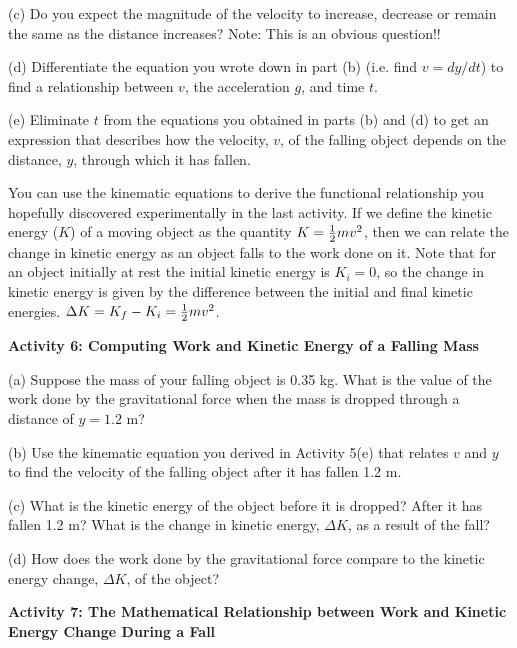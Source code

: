(c) Do you expect the magnitude of the velocity to increase, decrease or remain
the same as the distance increases? Note: This is an obvious question!!
\vspace{10mm}

(d) Differentiate the equation you wrote down in part (b) (i.e. find $v = dy/dt$) to find a relationship between $v$, the acceleration $g$, and time $t$.
\vspace{20mm}

(e) Eliminate $t$ from the equations you obtained in parts (b) and (d) to get
an expression that describes how the velocity, $v$, 
of the falling object depends
on the distance, $y$, through which it has fallen. 
\vspace{20mm}

You can use the kinematic equations to derive the functional relationship you
hopefully discovered experimentally in the last activity. If we define the kinetic
energy ($K$) of a moving object as the quantity $K = {1\over 2}mv^{2}$, then we
can relate the change in kinetic energy as an object falls to the work done
on it. Note that for an object initially at rest the initial kinetic energy
is \(K _{i}=0\), so the change in kinetic energy is given by the difference
between the initial and final kinetic energies. \( \Delta  K = K _{f}
- K_{i}  = {1\over 2}mv^{2} \).

\textbf{Activity 6: Computing Work and Kinetic Energy of a Falling Mass} 

(a) Suppose the mass of your falling object is 0.35 kg. What is the value of
the work done by the gravitational force when the mass is dropped through a
distance of $y = 1.2$ m? 
\vspace{20mm}

(b) Use the kinematic equation you derived in Activity 5(e) that relates $v$ and
$y$ to find the velocity of the falling object after it has fallen 1.2 m.
\vspace{20mm}

(c) What is the kinetic energy of the object before it is dropped? After it
has fallen 1.2 m? What is the change in kinetic energy, \( \Delta  K\), as
a result of the fall?
\vspace{20mm}

(d) How does the work done by the gravitational force compare to the kinetic
energy change, \( \Delta  K\), of the object?
\vspace{20mm}

\newpage

\textbf{Activity 7: The Mathematical Relationship between Work and Kinetic Energy
Change During a Fall }

